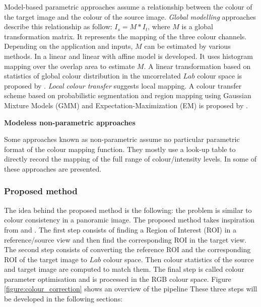 Model-based parametric approaches assume a relationship between the colour of the target image and the colour of the source image. \textit{Global modelling} approaches describe this relationship as follow: $I_{s}=M * I_{t}$, where $M$ is a global transformation matrix. It represents the mapping of the three colour channels. Depending on the application and inputs, $M$ can be estimated by various methods. In \cite{gui_yun_tian_colour_2002} a linear and linear with affine model is developed. It uses histogram mapping over the overlap area to estimate $M$. A linear transformation based on statistics of global colour distribution in the uncorrelated $Lab$ colour space is proposed by \cite{reinhard_color_2001}. \textit{Local colour transfer} suggests local mapping. A colour transfer scheme based on probabilistic segmentation and region mapping using Gaussian Mixture Models (GMM) and Expectation-Maximization (EM) is proposed by \cite{yu-wing_tai_local_2005}.


\textbf{Modeless non-parametric approaches}

Some approaches known as non-parametric assume no particular parametric format of the colour mapping function. They mostly use a look-up table to directly record the mapping of the full range of colour/intensity levels. In \cite{xu_performance_2010} some of these approaches are presented.




\subsubsection{Proposed method}

The idea behind the proposed method is the following: the problem is similar to colour consistency in a panoramic image. The proposed method takes inspiration from \cite{reinhard_color_2001} and \cite{dasari_reference_2016}. The first step consists of finding a Region of Interest (ROI) in a reference/source view and then find the corresponding ROI in the target view. The second step consists of converting the reference ROI and the corresponding ROI of the target image to $Lab$ colour space. Then colour statistics of the source and target image are computed to match them. The final step is called colour parameter optimisation and is processed in the RGB colour space. Figure \ref{figure:colour_correction} shows an overview of the pipeline These three steps will be developed in the following sections:


